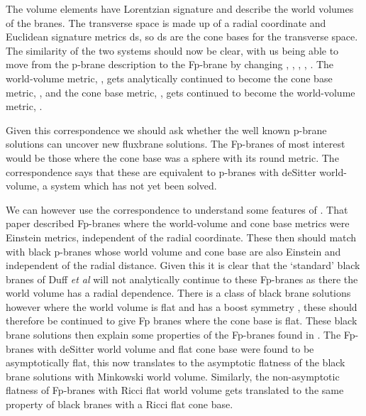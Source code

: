 \documentclass[a4paper,11pt]{article}
\begin{document}
The volume elements \coordHE{} have Lorentzian signature and
describe the world volumes of the branes. The transverse space is made
up of a radial coordinate \coordHE{} and Euclidean signature metrics ds\coordHE{},
so ds\coordHE{} are the cone bases for the transverse space.
The similarity of the two systems should now be clear, with us being
able to move from the p-brane description to the Fp-brane by 
changing \coordHE{}, \coordHE{}, 
\coordHE{}, \coordHE{}, \coordHE{}.
The world-volume metric, \coordHE{}, gets analytically
continued
to become the cone base metric, \coordHE{}, and the cone base
metric, \coordHE{}, 
gets continued to become the world-volume
metric, \coordHE{}.

Given this correspondence we should ask whether the well known p-brane
solutions can uncover new fluxbrane solutions. The Fp-branes of most
interest would be those where the cone base was a sphere with its round
metric. The correspondence says that these are equivalent to p-branes
with deSitter world-volume, a system which has not yet been solved.

We can however use the correspondence to understand some features of 
\cite{saffin01}. That paper described Fp-branes where the world-volume
and cone base metrics were Einstein metrics, independent of the radial
coordinate. These then should match with black p-branes whose world volume
and cone base are also Einstein and independent of the radial distance.
Given this it is clear that the `standard' black branes of Duff
{\it et al} \cite{duff96} will not analytically continue to these Fp-branes
as there the world volume has a radial dependence.
There is a class of black brane
solutions however where the
world volume is flat and has a boost symmetry \cite{gregory96}, these should
therefore be continued to give Fp branes where the cone base is flat.
These black brane solutions then explain some properties of the Fp-branes
found in \cite{saffin01}. The Fp-branes with deSitter world volume and
flat cone base were found to be asymptotically flat, this now translates
to the asymptotic flatness of the black brane solutions with Minkowski
world volume. Similarly, the non-asymptotic flatness of Fp-branes with
Ricci flat world volume gets translated to the same property of
black branes with a Ricci flat cone base.
\end{document}
